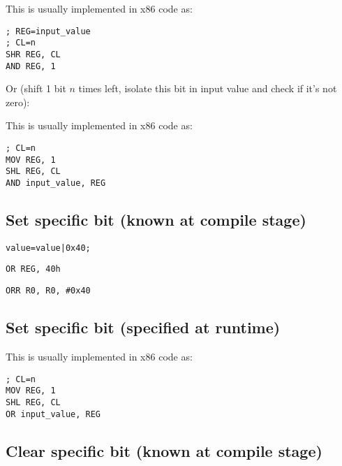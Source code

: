 This is usually implemented in x86 code as:

\begin{lstlisting}[caption=x86]
; REG=input_value
; CL=n
SHR REG, CL
AND REG, 1
\end{lstlisting}

Or (shift 1 bit $n$ times left, isolate this bit in input value and check if it's not zero):



This is usually implemented in x86 code as:

\begin{lstlisting}[caption=x86]
; CL=n
MOV REG, 1
SHL REG, CL
AND input_value, REG
\end{lstlisting}

\subsection{Set specific bit (known at compile stage)}

\begin{lstlisting}[caption=\CCpp]
value=value|0x40;
\end{lstlisting}

\begin{lstlisting}[caption=x86]
OR REG, 40h
\end{lstlisting}

\begin{lstlisting}[caption=ARM (\ARMMode) and ARM64]
ORR R0, R0, #0x40
\end{lstlisting}

\subsection{Set specific bit (specified at runtime)}



This is usually implemented in x86 code as:

\begin{lstlisting}[caption=x86]
; CL=n
MOV REG, 1
SHL REG, CL
OR input_value, REG
\end{lstlisting}

\subsection{Clear specific bit (known at compile stage)}

